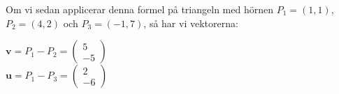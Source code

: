 \documentclass[a4paper]{report}
\begin{document}
\begin{enumerate}
\begin{enumerate}
                Om vi sedan applicerar denna formel på triangeln med hörnen $P_{1}=(1,1)$, $P_{2}=(4,2)$ och $P_{3}=(-1,7)$, så har vi vektorerna:\\
                \begin{center}
                    $\bm{v} = P_{1}-P_{2} = \begin{pmatrix}5\\-5\end{pmatrix}$\\
                    $\bm{u}=P_{1}-P_{3} = \begin{pmatrix}2\\-6\end{pmatrix}$\\
                \end{center}
                

\end{enumerate}
\end{enumerate}
\end{document}
